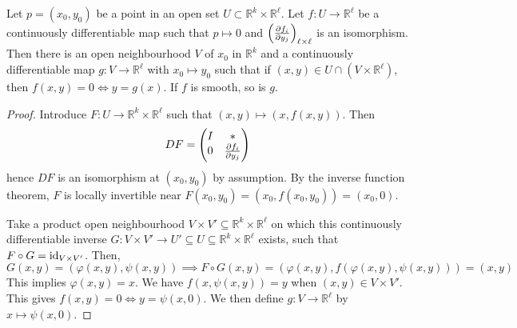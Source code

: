 \documentclass[a4paper,11pt]{article}
\begin{document}
\begin{theorem}
	Let \( p = (x_0, y_0) \) be a point in an open set \( U \subset \mathbb R^k \times \mathbb R^\ell \).
	Let \( f \colon U \to \mathbb R^\ell \) be a continuously differentiable map such that \( p \mapsto 0 \) and \( \qty(\pdv{f_i}{y_j})_{\ell \times \ell} \) is an isomorphism.
	Then there is an open neighbourhood \( V \) of \( x_0 \) in \( \mathbb R^k \) and a continuously differentiable map \( g \colon V \to \mathbb R^\ell \) with \( x_0 \mapsto y_0 \) such that if \( (x,y) \in U \cap (V \times \mathbb R^\ell) \), then \( f(x,y)=0\iff y=g(x) \).
	If \( f \) is smooth, so is \( g \).
\end{theorem}
\begin{proof}
	Introduce $ F:U\to \mathbb{R}^{k} \times \mathbb{R}^{\ell} $ such that $ (x,y) \mapsto (x,f(x,y)) $. Then 
	\[
		DF = \begin{pmatrix}
			I & \ast           \\
			0 & \pdv{f_i}{y_j}
		\end{pmatrix}
	\]
	hence \( DF \) is an isomorphism at \( (x_0, y_0) \) by assumption. By the inverse function theorem, \( F \) is locally invertible near \( F(x_0,y_0) = (x_0,f(x_0,y_0)) = (x_0, 0) \).

	 Take a product open neighbourhood \( V \times V' \subseteq \mathbb R^k \times \mathbb R^\ell \) on which this continuously differentiable inverse \( G \colon V \times V' \to U' \subseteq U \subseteq \mathbb R^k \times \mathbb R^\ell \) exists, such that \( F \circ G = \operatorname{id}_{V \times V'} \).
	 Then,
	\[
		G(x,y) = (\varphi(x,y), \psi(x,y)) \implies F \circ G(x,y) = (\varphi(x,y), f(\varphi(x,y), \psi(x,y))) = (x,y)
	\]
	This implies \( \varphi(x,y) = x \).
	We have \( f(x,\psi(x,y)) = y \) when \( (x,y) \in V \times V' \).
	This gives \( f(x,y) = 0 \iff y = \psi(x,0) \).
	We then define \( g \colon V \to \mathbb R^\ell \) by \( x \mapsto \psi(x,0) \).
\end{proof}
\end{document}
